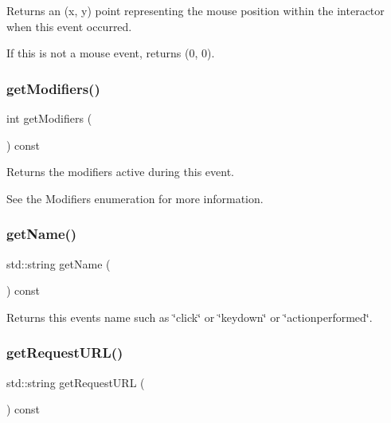 Returns an (x, y) point representing the mouse position within the interactor when this event occurred. 

If this is not a mouse event, returns (0, 0). \mbox{\label{classGEvent_ab8f99a1ccd9832faabeee792bc5702e2}} 
\subsubsection{\texorpdfstring{get\+Modifiers()}{getModifiers()}}
{\footnotesize\ttfamily int get\+Modifiers (\begin{DoxyParamCaption}{ }\end{DoxyParamCaption}) const\hspace{0.3cm}{\ttfamily [virtual]}}



Returns the modifiers active during this event. 

See the Modifiers enumeration for more information. \mbox{\label{classGEvent_a8a60438a5b55d0b2ceb35c8674b9d8c5}} 
\subsubsection{\texorpdfstring{get\+Name()}{getName()}}
{\footnotesize\ttfamily std\+::string get\+Name (\begin{DoxyParamCaption}{ }\end{DoxyParamCaption}) const\hspace{0.3cm}{\ttfamily [virtual]}}



Returns this event\textquotesingle{}s name such as \char`\"{}click\char`\"{} or \char`\"{}keydown\char`\"{} or \char`\"{}actionperformed\char`\"{}. 

\mbox{\label{classGEvent_add17fc1a534941f382f2fc7970269138}} 
\subsubsection{\texorpdfstring{get\+Request\+U\+R\+L()}{getRequestURL()}}
{\footnotesize\ttfamily std\+::string get\+Request\+U\+RL (\begin{DoxyParamCaption}{ }\end{DoxyParamCaption}) const\hspace{0.3cm}{\ttfamily [virtual]}}



